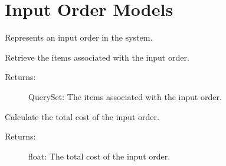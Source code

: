 \documentclass[letterpaper,10pt,english]{sphinxmanual}
\begin{document}
\chapter{Input Order Models}
\label{\detokenize{modules/models:module-InputHistory.models}}\label{\detokenize{modules/models:input-order-models}}

\begin{fulllineitems}
\label{\detokenize{modules/models:InputHistory.models.InputOrder}}
\sphinxAtStartPar
Represents an input order in the system.

\begin{fulllineitems}
\label{\detokenize{modules/models:InputHistory.models.InputOrder.DoesNotExist}}
\end{fulllineitems}


\begin{fulllineitems}
\label{\detokenize{modules/models:InputHistory.models.InputOrder.GetItems}}
\sphinxAtStartPar
Retrieve the items associated with the input order.
\begin{description}
\item[{Returns:}] \leavevmode
\sphinxAtStartPar
QuerySet: The items associated with the input order.

\end{description}

\end{fulllineitems}


\begin{fulllineitems}
\label{\detokenize{modules/models:InputHistory.models.InputOrder.GetTotal}}
\sphinxAtStartPar
Calculate the total cost of the input order.
\begin{description}
\item[{Returns:}] \leavevmode
\sphinxAtStartPar
float: The total cost of the input order.


\end{description}
\end{fulllineitems}
\end{fulllineitems}
\end{document}

